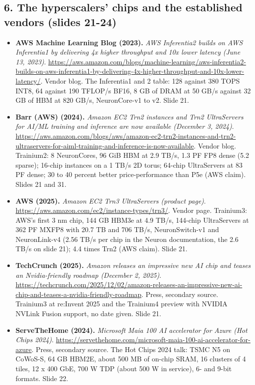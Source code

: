 \documentclass[11pt,letterpaper]{article}
\begin{document}
\subsection*{6. The hyperscalers' chips and the established vendors (slides 21-24)}
\begin{itemize}[leftmargin=1.2em,itemsep=3pt]\sloppy
\item \textbf{AWS Machine Learning Blog (2023).} \textit{AWS Inferentia2 builds on AWS Inferentia1 by delivering 4x higher throughput and 10x lower latency (June 13, 2023)}. \url{https://aws.amazon.com/blogs/machine-learning/aws-inferentia2-builds-on-aws-inferentia1-by-delivering-4x-higher-throughput-and-10x-lower-latency/}. Vendor blog. The Inferentia1 and 2 table: 128 against 380 TOPS INT8, 64 against 190 TFLOP/s BF16, 8 GB of DRAM at 50 GB/s against 32 GB of HBM at 820 GB/s, NeuronCore-v1 to v2. Slide 21.
\item \textbf{Barr (AWS) (2024).} \textit{Amazon EC2 Trn2 instances and Trn2 UltraServers for AI/ML training and inference are now available (December 3, 2024)}. \url{https://aws.amazon.com/blogs/aws/amazon-ec2-trn2-instances-and-trn2-ultraservers-for-aiml-training-and-inference-is-now-available}. Vendor blog. Trainium2: 8 NeuronCores, 96 GiB HBM at 2.9 TB/s, 1.3 PF FP8 dense (5.2 sparse); 16-chip instances on a 1 TB/s 2D torus; 64-chip UltraServers at 83 PF dense; 30 to 40 percent better price-performance than P5e (AWS claim). Slides 21 and 31.
\item \textbf{AWS (2025).} \textit{Amazon EC2 Trn3 UltraServers (product page)}. \url{https://aws.amazon.com/ec2/instance-types/trn3/}. Vendor page. Trainium3: AWS's first 3 nm chip, 144 GB HBM3e at 4.9 TB/s, 144-chip UltraServers at 362 PF MXFP8 with 20.7 TB and 706 TB/s, NeuronSwitch-v1 and NeuronLink-v4 (2.56 TB/s per chip in the Neuron documentation, the 2.6 TB/s on slide 21); 4.4 times Trn2 (AWS claim). Slide 21.
\item \textbf{TechCrunch (2025).} \textit{Amazon releases an impressive new AI chip and teases an Nvidia-friendly roadmap (December 2, 2025)}. \url{https://techcrunch.com/2025/12/02/amazon-releases-an-impressive-new-ai-chip-and-teases-a-nvidia-friendly-roadmap}. Press, secondary source. Trainium3 at re:Invent 2025 and the Trainium4 preview with NVIDIA NVLink Fusion support, no date given. Slide 21.
\item \textbf{ServeTheHome (2024).} \textit{Microsoft Maia 100 AI accelerator for Azure (Hot Chips 2024)}. \url{https://servethehome.com/microsoft-maia-100-ai-accelerator-for-azure}. Press, secondary source. The Hot Chips 2024 talk: TSMC N5 on CoWoS-S, 64 GB HBM2E, about 500 MB of on-chip SRAM, 16 clusters of 4 tiles, 12 x 400 GbE, 700 W TDP (about 500 W in service), 6- and 9-bit formats. Slide 22.

\end{itemize}
\end{document}
